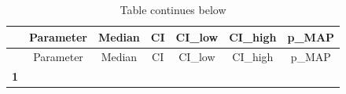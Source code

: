 \documentclass[
]{article}
\begin{document}
\begin{longtable}[]{@{}ccccccc@{}}
\caption{Table continues below}\tabularnewline
\toprule
\begin{minipage}[b]{0.09\columnwidth}\centering
~\strut
\end{minipage} & \begin{minipage}[b]{0.24\columnwidth}\centering
Parameter\strut
\end{minipage} & \begin{minipage}[b]{0.09\columnwidth}\centering
Median\strut
\end{minipage} & \begin{minipage}[b]{0.05\columnwidth}\centering
CI\strut
\end{minipage} & \begin{minipage}[b]{0.10\columnwidth}\centering
CI\_low\strut
\end{minipage} & \begin{minipage}[b]{0.10\columnwidth}\centering
CI\_high\strut
\end{minipage} & \begin{minipage}[b]{0.12\columnwidth}\centering
p\_MAP\strut
\end{minipage}\tabularnewline
\midrule
\endfirsthead
\toprule
\begin{minipage}[b]{0.09\columnwidth}\centering
~\strut
\end{minipage} & \begin{minipage}[b]{0.24\columnwidth}\centering
Parameter\strut
\end{minipage} & \begin{minipage}[b]{0.09\columnwidth}\centering
Median\strut
\end{minipage} & \begin{minipage}[b]{0.05\columnwidth}\centering
CI\strut
\end{minipage} & \begin{minipage}[b]{0.10\columnwidth}\centering
CI\_low\strut
\end{minipage} & \begin{minipage}[b]{0.10\columnwidth}\centering
CI\_high\strut
\end{minipage} & \begin{minipage}[b]{0.12\columnwidth}\centering
p\_MAP\strut
\end{minipage}\tabularnewline
\midrule
\endhead
\begin{minipage}[t]{0.09\columnwidth}\centering
\textbf{1}\strut
\end{minipage} & \begin{minipage}[t]{0.24\columnwidth}\centering

\end{minipage}
\end{longtable}
\end{document}
